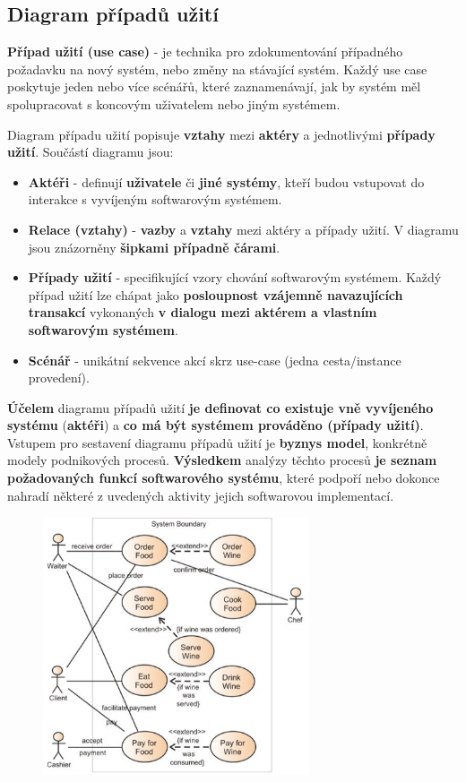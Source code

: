 \subsection{Diagram případů užití}
\textbf{Případ užití (use case)} - je technika pro zdokumentování případného požadavku na nový systém, nebo změny na stávající systém. Každý use case poskytuje jeden nebo více scénářů, které zaznamenávají, jak by systém měl spolupracovat s koncovým uživatelem nebo jiným systémem.

Diagram případu užití popisuje \textbf{vztahy} mezi \textbf{aktéry} a jednotlivými \textbf{případy užití}. Součástí diagramu jsou:
\begin{itemize}
\item \textbf{Aktéři} - definují \textbf{uživatele} či \textbf{jiné systémy}, kteří budou vstupovat do interakce s vyvíjeným softwarovým systémem.
\item \textbf{Relace (vztahy)} - \textbf{vazby} a \textbf{vztahy} mezi aktéry a případy užití. V diagramu jsou znázorněny \textbf{šipkami případně čárami}.
\item \textbf{Případy užití} - specifikující vzory chování  softwarovým systémem.  Každý případ užití lze chápat jako \textbf{posloupnost vzájemně navazujících transakcí} vykonaných \textbf{v dialogu mezi aktérem a vlastním softwarovým systémem}.
\item \textbf{Scénář} - unikátní sekvence akcí skrz use-case (jedna cesta/instance provedení).
\end{itemize}
\textbf{Účelem} diagramu případů užití \textbf{je definovat co existuje vně vyvíjeného systému} (\textbf{aktéři}) a \textbf{co má být systémem prováděno (případy užití)}. Vstupem pro sestavení diagramu případů užití je \textbf{byznys model}, konkrétně modely podnikových procesů.  \textbf{Výsledkem} analýzy těchto procesů \textbf{je seznam požadovaných funkcí softwarového systému}, které podpoří nebo dokonce nahradí některé z uvedených aktivity jejich softwarovou implementací.

\begin{figure}[H]
	\centering
	\includegraphics[width=0.7\textwidth]{assets/usecase.png}
\end{figure}

